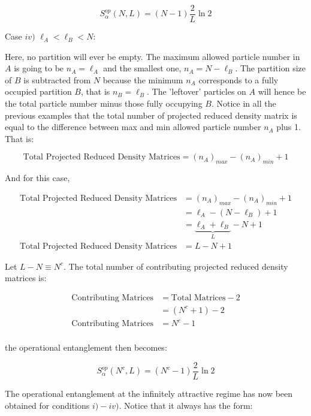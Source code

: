\begin{equation}
S_{\alpha}^{op} (N, L) = (N - 1) \frac{2}{L} \ln{2}
\end{equation}

Case $iv)$ $\ell_{A} < \ell_{B} < N$:

Here, no partition will ever be empty. The maximum allowed particle number in $A$ is going to be $n_{A} = \ell_{A}$ and the smallest one, $n_{A} = N - \ell_{B}$. The partition size of $B$ is subtracted from $N$ because the minimum $n_A$ corresponds to a fully occupied partition $B$, that is $n_B = \ell_B$. The 'leftover' particles on $A$ will hence be the total particle number minus those fully occupying $B$. Notice in all the previous examples that the total number of projected reduced density matrix is equal to the difference between max and min allowed particle number $n_A$ plus 1. That is:

\begin{equation}
\text{Total Projected Reduced Density Matrices} = (n_A)_{max} - (n_A)_{min} + 1
\end{equation}

And for this case,

 \begin{align}
\text{Total Projected Reduced Density Matrices} &= (n_A)_{max} - (n_A)_{min} + 1 \\
&= \ell_A - (N-\ell_B) + 1 \\
&= \underbrace{\ell_A + \ell_B}_{L} - N + 1 \\
\text{Total Projected Reduced Density Matrices} &= L - N + 1
\end{align}

Let $L-N \equiv N^c$. The total number of contributing projected reduced density matrices is:

\begin{align}
\text{Contributing Matrices} &= \text{Total Matrices} - 2 \\
&= (N^c + 1) - 2 \\
\text{Contributing Matrices} &= N^c - 1 \\
\end{align}

the operational entanglement then becomes:

\begin{equation}
S_\alpha^{op}(N^c,L) = (N^c - 1) \frac{2}{L} \ln{2}
\end{equation}

The operational entanglement at the infinitely attractive regime has now been obtained for conditions $i)-iv)$. Notice that it always has the form:

